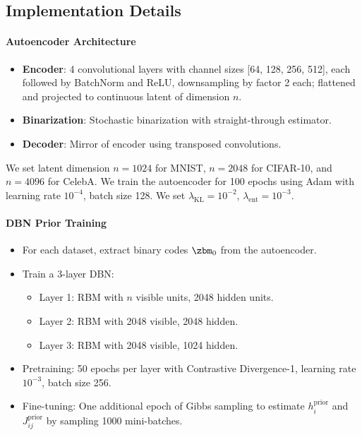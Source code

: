 \documentclass[11pt,letterpaper]{article}
\begin{document}
\subsection{Implementation Details}
\paragraph{Autoencoder Architecture}
\begin{itemize}[noitemsep,topsep=0pt]
    \item \textbf{Encoder}: 4 convolutional layers with channel sizes [64, 128, 256, 512], each followed by BatchNorm and ReLU, downsampling by factor 2 each; flattened and projected to continuous latent of dimension $n$. 
    \item \textbf{Binarization}: Stochastic binarization with straight-through estimator.
    \item \textbf{Decoder}: Mirror of encoder using transposed convolutions.
\end{itemize}
We set latent dimension $n=1024$ for MNIST, $n=2048$ for CIFAR-10, and $n=4096$ for CelebA. We train the autoencoder for 100 epochs using Adam \cite{kingma2014adam} with learning rate $10^{-4}$, batch size 128. We set $\lambda_{\text{KL}}=10^{-2}$, $\lambda_{\text{ent}}=10^{-3}$.

\paragraph{DBN Prior Training}
\begin{itemize}[noitemsep,topsep=0pt]
    \item For each dataset, extract binary codes $\zbm_0$ from the autoencoder.
    \item Train a 3-layer DBN: 
    \begin{itemize}[noitemsep,topsep=0pt]
        \item Layer 1: RBM with $n$ visible units, 2048 hidden units.
        \item Layer 2: RBM with 2048 visible, 2048 hidden.
        \item Layer 3: RBM with 2048 visible, 1024 hidden.
    \end{itemize}
    \item Pretraining: 50 epochs per layer with Contrastive Divergence-1, learning rate $10^{-3}$, batch size 256.
    \item Fine-tuning: One additional epoch of Gibbs sampling to estimate $h_i^{\text{prior}}$ and $J_{ij}^{\text{prior}}$ by sampling 1000 mini-batches.
\end{itemize}
\end{document}
